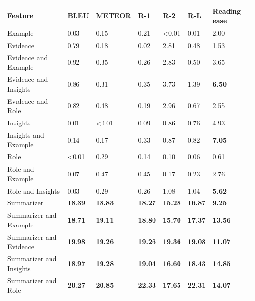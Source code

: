 \begin{tabular}{|l|l|l|l|l|l|l|}
\hline
\textbf{Feature} & BLEU & METEOR & R-1 & R-2 & R-L & Reading ease \\
 \hline
 Example & 0.03 & 0.15 & 0.21 & \textless{}0.01 & 0.01 & 2.00 \\
 \hline
 Evidence & 0.79 & 0.18 & 0.02 & 2.81 & 0.48 & 1.53 \\
 \hline
 Evidence and Example & 0.92 & 0.35 & 0.26 & 2.83 & 0.50 & 3.65 \\
 \hline
 Evidence and Insights & 0.86 & 0.31 & 0.35 & 3.73 & 1.39 & \textbf{6.50} \\
 \hline
 Evidence and Role & 0.82 & 0.48 & 0.19 & 2.96 & 0.67 & 2.55 \\
 \hline
 Insights & 0.01 & \textless{}0.01 & 0.09 & 0.86 & 0.76 & 4.93 \\
 \hline
 Insights and Example & 0.14 & 0.17 & 0.33 & 0.87 & 0.82 & \textbf{7.05} \\
 \hline
 Role & \textless{}0.01 & 0.29 & 0.14 & 0.10 & 0.06 & 0.61 \\
 \hline
 Role and Example & 0.07 & 0.47 & 0.45 & 0.17 & 0.23 & 2.76 \\
 \hline
 Role and Insights & 0.03 & 0.29 & 0.26 & 1.08 & 1.04 & \textbf{5.62} \\
 \hline
 Summarizer & \textbf{18.39} & \textbf{18.83} & \textbf{18.27} & \textbf{15.28} & \textbf{16.87} & \textbf{9.25} \\
 \hline
 Summarizer and Example & \textbf{18.71} & \textbf{19.11} & \textbf{18.80} & \textbf{15.70} & \textbf{17.37} & \textbf{13.56} \\
 \hline
 Summarizer and Evidence & \textbf{19.98} & \textbf{19.26} & \textbf{19.26} & \textbf{19.36} & \textbf{19.08} & \textbf{11.07} \\
 \hline
 Summarizer and Insights & \textbf{18.97} & \textbf{19.28} & \textbf{19.04} & \textbf{16.60} & \textbf{18.43} & \textbf{14.85} \\
 \hline
 Summarizer and Role & \textbf{20.27} & \textbf{20.85} & \textbf{22.33} & \textbf{17.65} & \textbf{22.31} & \textbf{14.07} \\
\hline
\end{tabular}
